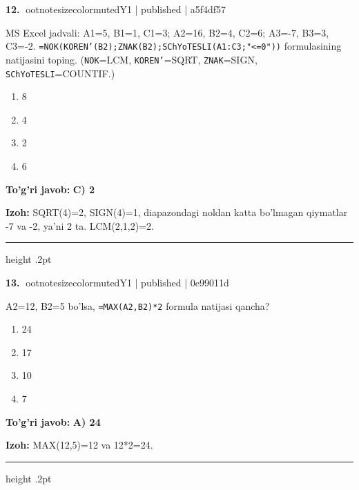 \documentclass[10pt,a4paper]{article}
\begin{document}
\textbf{\color{ink}12.} {ootnotesizecolor{muted}Y1 | published | a5f4df57}
\par
MS Excel jadvali: A1=5, B1=1, C1=3; A2=16, B2=4, C2=6; A3=-7, B3=3, C3=-2. \texttt{=NOK(KOREN'(B2);ZNAK(B2);SChYoTESLI(A1:C3;"\textless{}=0"))} formulasining natijasini toping. (\texttt{NOK}=LCM, \texttt{KOREN'}=SQRT, \texttt{ZNAK}=SIGN, \texttt{SChYoTESLI}=COUNTIF.)
\begin{enumerate}[label=\Alph*),leftmargin=9mm]
\item 8
\item 4
\item 2
\item 6
\end{enumerate}
\begin{tcolorbox}[enhanced,breakable,colback=teal!4,colframe=teal!55!black,boxrule=0.45pt,arc=1.2mm,left=2.8mm,right=2.8mm,top=2mm,bottom=2mm]
\textbf{\color{teal}To'g'ri javob:} \textbf{C) 2}
\par\smallskip
\textbf{Izoh:} SQRT(4)=2, SIGN(4)=1, diapazondagi noldan katta bo'lmagan qiymatlar -7 va -2, ya'ni 2 ta. LCM(2,1,2)=2.
\end{tcolorbox}
\vspace{2mm}\hrule height .2pt\vspace{2mm}

\textbf{\color{ink}13.} {ootnotesizecolor{muted}Y1 | published | 0e99011d}
\par
A2=12, B2=5 bo'lsa, \texttt{=MAX(A2,B2)*2} formula natijasi qancha?
\begin{enumerate}[label=\Alph*),leftmargin=9mm]
\item 24
\item 17
\item 10
\item 7
\end{enumerate}
\begin{tcolorbox}[enhanced,breakable,colback=teal!4,colframe=teal!55!black,boxrule=0.45pt,arc=1.2mm,left=2.8mm,right=2.8mm,top=2mm,bottom=2mm]
\textbf{\color{teal}To'g'ri javob:} \textbf{A) 24}
\par\smallskip
\textbf{Izoh:} MAX(12,5)=12 va 12*2=24.
\end{tcolorbox}
\vspace{2mm}\hrule height .2pt\vspace{2mm}
\end{document}
